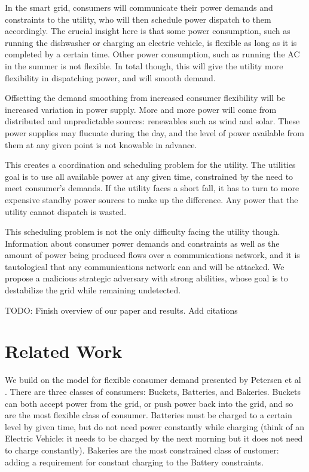 \documentclass[conference]{IEEEtran}
\begin{document}
In the smart grid, consumers will communicate their power demands and constraints to the utility, who will then schedule
power dispatch to them accordingly.  The crucial insight here is that some power consumption, such as running the dishwasher or charging an electric vehicle, is flexible as long as it is completed by a certain time.  Other power consumption, such as running the AC in the summer is not flexible.  In total though, this will give the utility more flexibility in dispatching power, and will smooth demand.

Offsetting the demand smoothing from increased consumer flexibility will be increased variation in power supply.  More and more power will come from distributed and unpredictable sources: renewables such as wind and solar.  These power supplies may flucuate during the day, and the level of power available from them at any given point is not knowable in advance.

This creates a coordination and scheduling problem for the utility.  The utilities goal is to use all available power at any
given time, constrained by the need to meet consumer's demands.  If the utility faces a short fall, it has to turn to more 
expensive standby power sources to make up the difference.  Any power that the utility cannot dispatch is wasted.

This scheduling problem is not the only difficulty facing the utility though.  Information about consumer power demands and constraints as well as the amount of power being produced flows over a communications network, and it is tautological that any communications network can and will be attacked.  We propose a malicious strategic adversary with strong abilities, whose goal is to destabilize the grid while remaining undetected. 

TODO: Finish overview of our paper and results.  Add citations

\section{Related Work}
\label{Related Work}

We build on the model for flexible consumer demand presented by Petersen et al \cite{petersen2013taxonomy}.  There are three classes of consumers: Buckets, Batteries, and Bakeries.  Buckets can both accept power from the grid, or push power back into the grid, and so are the most flexible class of consumer.  Batteries must be charged to a certain level by given time, but do not need power constantly while charging (think of an Electric Vehicle: it needs to be charged by the next morning but it does not need to charge constantly).  Bakeries are the most constrained class of customer: adding a requirement for constant charging to the Battery constraints.
\end{document}
